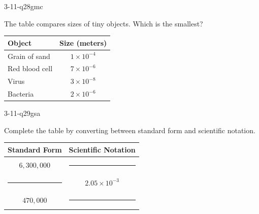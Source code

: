 \begin{practiceQuestion}{3-11-q28}{gmc}
\begin{questionText}
The table compares sizes of tiny objects. Which is the smallest?

\begin{center}
\begin{tabular}{|l|c|}
\hline
\textbf{Object} & \textbf{Size (meters)} \\
\hline
Grain of sand & $1 \times 10^{-4}$ \\
\hline
Red blood cell & $7 \times 10^{-6}$ \\
\hline
Virus & $3 \times 10^{-8}$ \\
\hline
Bacteria & $2 \times 10^{-6}$ \\
\hline
\end{tabular}
\end{center}
\end{questionText}
\end{practiceQuestion}

\begin{practiceQuestion}{3-11-q29}{gsa}
\begin{questionText}
Complete the table by converting between standard form and scientific notation.

\begin{center}
\begin{tabular}{|c|c|}
\hline
\textbf{Standard Form} & \textbf{Scientific Notation} \\
\hline
$6{,}300{,}000$ & \rule{3cm}{0.4pt} \\
\hline
\rule{3cm}{0.4pt} & $2.05 \times 10^{-3}$ \\
\hline
$470{,}000$ & \rule{3cm}{0.4pt} \\
\hline
\end{tabular}
\end{center}
\end{questionText}
\end{practiceQuestion}

